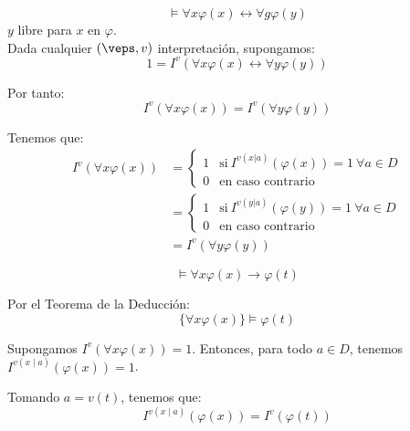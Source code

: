 \begin{ejemplo}
    \begin{equation*}
        \vDash \forall x\varphi(x)\longleftrightarrow \forall g\varphi(y)
    \end{equation*}
    $y$ libre para $x$ en $\varphi$.\\

    Dada cualquier $(\veps,v)$ interpretación, supongamos:
    \begin{equation*}
        1=I^v(\forall x\varphi(x)\longleftrightarrow \forall y\varphi(y))
    \end{equation*}

    Por tanto:
    \begin{equation*}
        I^v\left(\forall x\varphi(x)\right)=I^v\left(\forall y\varphi(y)\right)
    \end{equation*}

    Tenemos que:
    \begin{align*}
        I^v\left(\forall x\varphi(x)\right)
        &= \begin{cases}
            1 & \text{si}\ I^{v(x|a)}(\varphi(x))=1\ \forall a\in D\\
            0 & \text{en caso contrario}
        \end{cases}\\
        &= \begin{cases}
            1 & \text{si}\ I^{v(y|a)}(\varphi(y))=1\ \forall a\in D\\
            0 & \text{en caso contrario}
        \end{cases}
        \\&= I^v\left(\forall y\varphi(y)\right)
    \end{align*}
\end{ejemplo}

\begin{ejemplo}
    \begin{equation*}
        \vDash \forall x\varphi(x)\to \varphi(t)
    \end{equation*}

    Por el Teorema de la Deducción:
    \begin{equation*}
        \{\forall x\varphi(x)\}\vDash \varphi(t)
    \end{equation*}

    Supongamos $I^v(\forall x\varphi(x))=1$. Entonces, para todo $a\in D$, tenemos $I^{v(x\mid a)}(\varphi(x))=1$.

    Tomando $a=v(t)$, tenemos que:
    \begin{equation*}
        I^{v(x\mid a)}(\varphi(x))=I^v(\varphi(t))
    \end{equation*}
\end{ejemplo}














